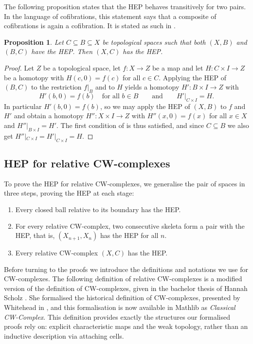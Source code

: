 \documentclass[11pt, a4paper, english]{article}
\theoremstyle{plain}
\newtheorem{proposition}[theorem]{Proposition}
\theoremstyle{definition}
\theoremstyle{remark}
\numberwithin{equation}{section}
\numberwithin{theorem}{section}
\begin{document}
The following proposition states that the HEP behaves transitively for two pairs. In the language of cofibrations, this statement says that a composite of cofibrations is again a cofibration. It is stated as such in \cite[Problem~5.2]{Strom}.

\begin{proposition} \label{prop:HEPtrans}
    Let $C \subseteq B \subseteq X$ be topological spaces such that both $(X,B)$ and $(B,C)$ have the HEP. Then $(X,C)$ has the HEP.
\end{proposition}

\begin{proof}
    Let $Z$ be a topological space, let $f \colon X \to Z$ be a map and let $H \colon C \times I \to Z$ be a homotopy with $H(c,0) = f(c)$ for all $c \in C$. Applying the HEP of $(B,C)$ to the restriction $f|_B$ and to $H$ yields a homotopy $H' \colon B \times I \to Z$ with
    \[
        H'(b,0) = f(b) \quad \text{for all } b \in B
        \qquad\text{and}\qquad
        H'|_{C \times I} = H .
    \]
    In particular $H'(b,0) = f(b)$, so we may apply the HEP of $(X,B)$ to $f$ and $H'$ and obtain a homotopy $H'' \colon X \times I \to Z$ with $H''(x,0) = f(x)$ for all $x \in X$ and $H''|_{B \times I} = H'$. The first condition of  is thus satisfied, and since $C \subseteq B$ we also get $H''|_{C \times I} = H'|_{C \times I} = H$.
\end{proof}

\subsection{HEP for relative CW-complexes} \label{subsec:HEP_relCW}

To prove the HEP for relative CW-complexes, we generalise the pair of spaces in three steps, proving the HEP at each stage:
\begin{enumerate}
    \item Every closed ball relative to its boundary has the HEP. 
    \item For every relative CW-complex, two consecutive skeleta form a pair with the HEP, that is, $(X_{n+1}, X_n)$ has the HEP for all $n$.
    \item Every relative CW-complex $(X,C)$ has the HEP.
\end{enumerate}

Before turning to the proofs we introduce the definitions and notations we use for CW-complexes. The following definition of relative CW-complexes is a modified version of the definition of CW-complexes, given in the bachelor thesis of Hannah Scholz \cite{SCH01}. She formalised the historical definition of CW-complexes, presented by Whitehead in \cite{WH}, and this formalisation is now available in Mathlib as \emph{Classical CW-Complex}. This definition provides exactly the structures our formalised proofs rely on: explicit characteristic maps and the weak topology, rather than an inductive description via attaching cells.
\end{document}
